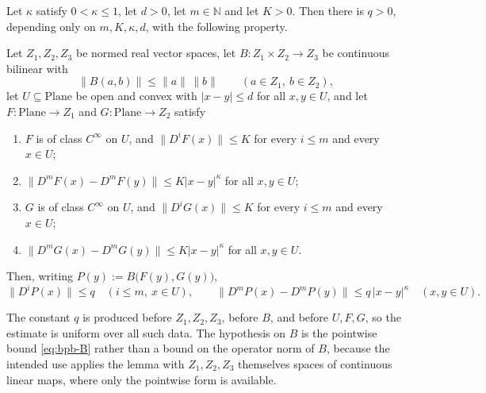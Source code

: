 \begin{lemma}
Let $\kappa$ satisfy $0<\kappa\le1$, let $d>0$, let $m\in\mathbb{N}$ and let $K>0$.  Then there
is $q>0$, depending only on $m,K,\kappa,d$, with the following property.

Let $Z_1,Z_2,Z_3$ be normed real vector spaces, let $B\colon Z_1\times Z_2\to Z_3$ be continuous
bilinear with
\begin{equation}\label{eq:bpb-B}
  \bigl\lVert B(a,b)\bigr\rVert\le\lVert a\rVert\,\lVert b\rVert\qquad(a\in Z_1,\ b\in Z_2),
\end{equation}
let $U\subseteq\mathrm{Plane}$ be open and convex with $\lvert x-y\rvert\le d$ for all
$x,y\in U$, and let $F\colon\mathrm{Plane}\to Z_1$ and $G\colon\mathrm{Plane}\to Z_2$ satisfy
\begin{enumerate}
\item[(F1)] $F$ is of class $C^{\infty}$ on $U$, and
  $\bigl\lVert D^{i}F(x)\bigr\rVert\le K$ for every $i\le m$ and every $x\in U$;
\item[(F2)] $\bigl\lVert D^{m}F(x)-D^{m}F(y)\bigr\rVert\le K\lvert x-y\rvert^{\kappa}$ for all
  $x,y\in U$;
\item[(G1)] $G$ is of class $C^{\infty}$ on $U$, and
  $\bigl\lVert D^{i}G(x)\bigr\rVert\le K$ for every $i\le m$ and every $x\in U$;
\item[(G2)] $\bigl\lVert D^{m}G(x)-D^{m}G(y)\bigr\rVert\le K\lvert x-y\rvert^{\kappa}$ for all
  $x,y\in U$.
\end{enumerate}
Then, writing $P(y):=B\bigl(F(y),G(y)\bigr)$,
\[
  \bigl\lVert D^{i}P(x)\bigr\rVert\le q\quad(i\le m,\ x\in U),
  \qquad
  \bigl\lVert D^{m}P(x)-D^{m}P(y)\bigr\rVert\le q\,\lvert x-y\rvert^{\kappa}\quad(x,y\in U).
\]

The constant $q$ is produced before $Z_1,Z_2,Z_3$, before $B$, and before $U,F,G$, so the
estimate is uniform over all such data.  The hypothesis on $B$ is the pointwise bound
\eqref{eq:bpb-B} rather than a bound on the operator norm of $B$, because the intended use
applies the lemma with $Z_1,Z_2,Z_3$ themselves spaces of continuous linear maps, where only the
pointwise form is available.
\end{lemma}
